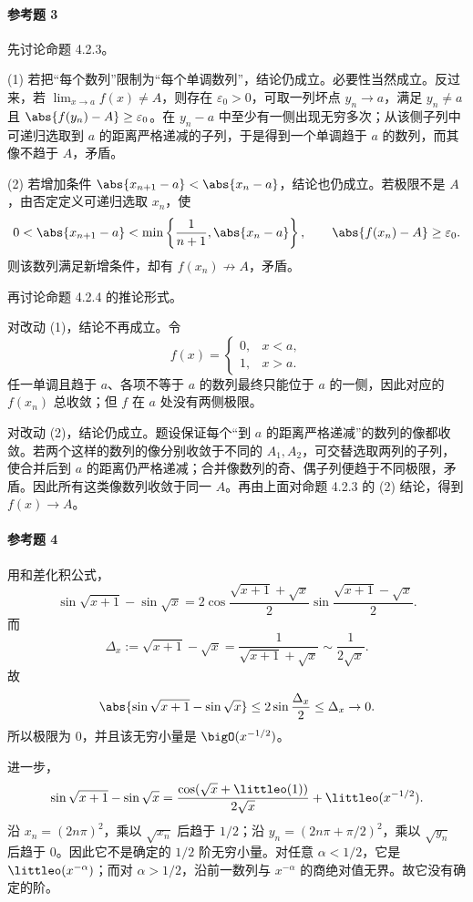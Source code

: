 \paragraph{参考题 3}
\begin{xsolution}
先讨论命题 4.2.3。

(1) 若把“每个数列”限制为“每个单调数列”，结论仍成立。必要性当然成立。反过来，若
$\lim_{x\to a}f(x)\ne A$，则存在 $\varepsilon_0>0$，可取一列坏点 $y_n\to a$，满足
$y_n\ne a$ 且 $\abs{f(y_n)-A}\geq\varepsilon_0$。在 $y_n-a$ 中至少有一侧出现无穷多次；从该侧子列中可递归选取到 $a$ 的距离严格递减的子列，于是得到一个单调趋于 $a$ 的数列，而其像不趋于 $A$，矛盾。

(2) 若增加条件
$\abs{x_{n+1}-a}<\abs{x_n-a}$，结论也仍成立。若极限不是 $A$，由否定定义可递归选取
$x_n$，使
\[
  0<\abs{x_{n+1}-a}<\min\left\{\frac1{n+1},\abs{x_n-a}\right\},
  \qquad
  \abs{f(x_n)-A}\geq\varepsilon_0.
\]
则该数列满足新增条件，却有 $f(x_n)\not\to A$，矛盾。

再讨论命题 4.2.4 的推论形式。

对改动 (1)，结论不再成立。令
\[
  f(x)=\begin{cases}
    0,&x<a,\\
    1,&x>a.
  \end{cases}
\]
任一单调且趋于 $a$、各项不等于 $a$ 的数列最终只能位于 $a$ 的一侧，因此对应的 $f(x_n)$ 总收敛；但 $f$ 在 $a$ 处没有两侧极限。

对改动 (2)，结论仍成立。题设保证每个“到 $a$ 的距离严格递减”的数列的像都收敛。若两个这样的数列的像分别收敛于不同的 $A_1,A_2$，可交替选取两列的子列，使合并后到 $a$ 的距离仍严格递减；合并像数列的奇、偶子列便趋于不同极限，矛盾。因此所有这类像数列收敛于同一 $A$。再由上面对命题 4.2.3 的 (2) 结论，得到 $f(x)\to A$。
\end{xsolution}

\paragraph{参考题 4}
\begin{xsolution}
用和差化积公式，
\[
  \sin\sqrt{x+1}-\sin\sqrt{x}
  =2\cos\frac{\sqrt{x+1}+\sqrt{x}}2
    \sin\frac{\sqrt{x+1}-\sqrt{x}}2.
\]
而
\[
  \Delta_x:=\sqrt{x+1}-\sqrt{x}
  =\frac1{\sqrt{x+1}+\sqrt{x}}
  \sim\frac1{2\sqrt{x}}.
\]
故
\[
  \abs{\sin\sqrt{x+1}-\sin\sqrt{x}}
  \leq2\sin\frac{\Delta_x}{2}\leq\Delta_x\to0.
\]
所以极限为 0，并且该无穷小量是 $\bigO(x^{-1/2})$。

进一步，
\[
  \sin\sqrt{x+1}-\sin\sqrt{x}
  =\frac{\cos(\sqrt{x}+\littleo(1))}{2\sqrt{x}}
   +\littleo(x^{-1/2}).
\]
沿 $x_n=(2n\pi)^2$，乘以 $\sqrt{x_n}$ 后趋于 $1/2$；沿
$y_n=(2n\pi+\pi/2)^2$，乘以 $\sqrt{y_n}$ 后趋于 0。因此它不是确定的 $1/2$ 阶无穷小量。对任意 $\alpha<1/2$，它是 $\littleo(x^{-\alpha})$；而对 $\alpha>1/2$，沿前一数列与 $x^{-\alpha}$ 的商绝对值无界。故它没有确定的阶。
\end{xsolution}

